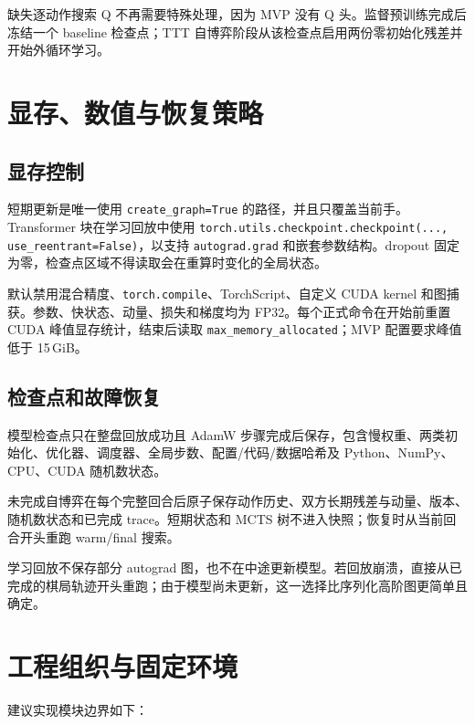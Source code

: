 \documentclass[UTF8,11pt,a4paper]{ctexart}
\newcommand{\code}[1]{\texttt{#1}}
\begin{document}
缺失逐动作搜索 Q 不再需要特殊处理，因为 MVP 没有 Q 头。监督预训练完成后冻结一个 baseline 检查点；TTT 自博弈阶段从该检查点启用两份零初始化残差并开始外循环学习。

\section{显存、数值与恢复策略}

\subsection{显存控制}

短期更新是唯一使用 \code{create\_graph=True} 的路径，并且只覆盖当前手。Transformer 块在学习回放中使用
\code{torch.utils.checkpoint.checkpoint(..., use\_reentrant=False)}，以支持 \code{autograd.grad} 和嵌套参数结构\cite{pytorch-checkpoint,pytorch-autograd}。dropout 固定为零，检查点区域不得读取会在重算时变化的全局状态。

默认禁用混合精度、\code{torch.compile}、TorchScript、自定义 CUDA kernel 和图捕获。参数、快状态、动量、损失和梯度均为 FP32。每个正式命令在开始前重置 CUDA 峰值显存统计，结束后读取 \code{max\_memory\_allocated}；MVP 配置要求峰值低于 15\,GiB。

\subsection{检查点和故障恢复}

模型检查点只在整盘回放成功且 AdamW 步骤完成后保存，包含慢权重、两类初始化、优化器、调度器、全局步数、配置/代码/数据哈希及 Python、NumPy、CPU、CUDA 随机数状态。

未完成自博弈在每个完整回合后原子保存动作历史、双方长期残差与动量、版本、随机数状态和已完成 trace。短期状态和 MCTS 树不进入快照；恢复时从当前回合开头重跑 warm/final 搜索。

学习回放不保存部分 autograd 图，也不在中途更新模型。若回放崩溃，直接从已完成的棋局轨迹开头重跑；由于模型尚未更新，这一选择比序列化高阶图更简单且确定。

\section{工程组织与固定环境}

建议实现模块边界如下：
\end{document}
